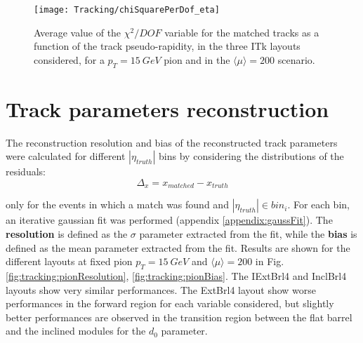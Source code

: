 \documentclass[a4paper,twoside,12pt]{book}
\begin{document}
\begin{figure}
\centering
\texttt{[image: Tracking/chiSquarePerDof\_eta]}
\caption{Average value of the $\chi^{2}/DOF$ variable for the matched tracks as a function of the track pseudo-rapidity, in the three ITk layouts considered, for a $p_{T} = 15\ GeV$ pion
and in the $\langle\mu\rangle = 200$ scenario.}
\label{fig:tracking:chiSqPerDof_eta}
\end{figure}

\section{Track parameters reconstruction}\label{sec:tracking:resolution}
The reconstruction resolution and bias of the reconstructed track parameters were calculated for different $|\eta_{truth}|$ bins by considering the distributions of the residuals:\\
$$
\Delta_{x} = x_{matched} - x_{truth}
$$

only for the events in which a match was found and $|\eta_{truth}| \in bin_{i}$. For each bin, an iterative gaussian fit was performed (appendix \ref{appendix:gaussFit}). The \textbf{resolution}
is defined as the $\sigma$ parameter extracted from the fit, while the \textbf{bias} is defined as the mean parameter extracted from the fit. Results are shown for the different layouts at
fixed pion $p_{T} = 15\ GeV$ and $\langle\mu\rangle = 200$ in Fig.\ref{fig:tracking:pionResolution}, \ref{fig:tracking:pionBias}. The IExtBrl4 and InclBrl4 layouts show very similar
performances. The ExtBrl4 layout show worse performances in the forward region for
each variable considered, but slightly better performances are observed in the transition
region between the flat barrel and the inclined modules for the $d_{0}$ parameter. \\
\end{document}
